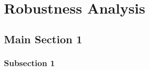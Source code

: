 \chapter{Robustness Analysis}

\label{Chapter-Robustness-Analysis}

\section{Main Section 1}
\subsection{Subsection 1}
